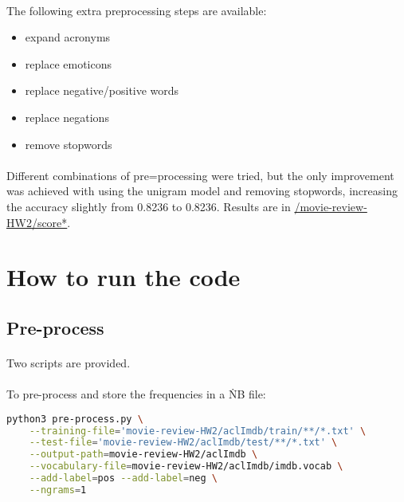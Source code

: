 \documentclass{article}
\begin{document}
\paragraph{} The following extra preprocessing steps are available:

\begin{itemize}
\item expand acronyms
\item replace emoticons
\item replace negative/positive words
\item replace negations
\item remove stopwords
\end{itemize}

\paragraph{} Different combinations of pre=processing were tried, but the only improvement was achieved with using the unigram model and removing stopwords, increasing the accuracy slightly from 0.8236 to 0.8236\@. Results are in \url{/movie-review-HW2/score*}\@.

\clearpage

\section*{How to run the code}

\subsection*{Pre-process}

\paragraph{} Two scripts are provided.

\paragraph{} To pre-process and store the frequencies in a \.NB file:

\begin{lstlisting}[language=bash]
python3 pre-process.py \
    --training-file='movie-review-HW2/aclImdb/train/**/*.txt' \
    --test-file='movie-review-HW2/aclImdb/test/**/*.txt' \
    --output-path=movie-review-HW2/aclImdb \
    --vocabulary-file=movie-review-HW2/aclImdb/imdb.vocab \
    --add-label=pos --add-label=neg \
    --ngrams=1
\end{lstlisting}
\end{document}
